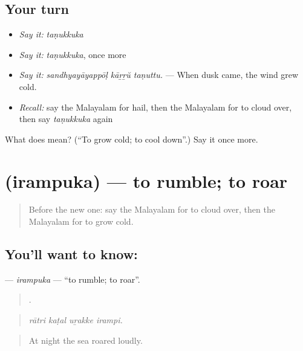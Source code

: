 \subsection*{Your turn}
\begin{itemize}
\raggedright
  \item \emph{Say it:} \emph{taṇukkuka}
  \item \emph{Say it:} \emph{taṇukkuka}, once more
  \item \emph{Say it:} \emph{sandhyayāyappōḷ kāṟṟŭ taṇuttu.} — When dusk came, the wind grew cold.
  \item \emph{Recall:} say the Malayalam for hail, then the Malayalam for to cloud over, then say \emph{taṇukkuka} again
\end{itemize}

\begin{tcolorbox}[breakable,colback=teal!4,colframe=teal!35!black,title={Before you move on}]
What does  mean? (\textquotedblleft{}To grow cold; to cool down\textquotedblright{}.) Say it once more.
\end{tcolorbox}
\section[\texorpdfstring{\ml{ഇരമ്പുക} (irampuka)}{ഇരമ്പുക (irampuka)}]{ (irampuka) — to rumble; to roar}

\label{lesson:ML-C510-irampuka}



\begin{quote}
Before the new one: say the Malayalam for to cloud over, then the Malayalam for to grow cold.
\end{quote}

\subsection*{You'll want to know: }
\textbf{} — \emph{irampuka} — \textquotedblleft{}to rumble; to roar\textquotedblright{}.

\begin{quote}
   .
\end{quote}

\begin{quote}
\emph{rātri kaṭal uṟakke irampi.}
\end{quote}

\begin{quote}
At night the sea roared loudly.
\end{quote}

